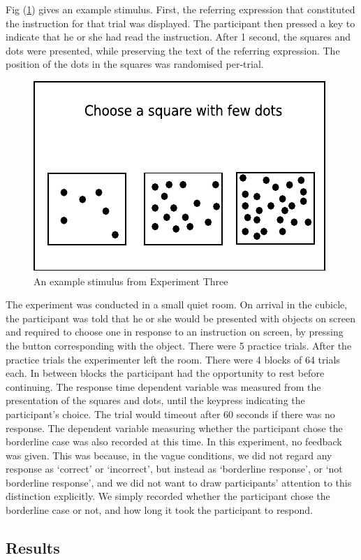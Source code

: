\documentclass[doc,apacite]{apa6}
\begin{document}
Fig (\ref{stimuluse3}) gives an example stimulus. First, the referring expression that constituted the instruction for that trial was displayed. The participant then pressed a key to indicate that he or she had read the instruction. After 1 second,  the squares and dots were presented, while preserving the text of the referring expression. The position of the dots in the squares was randomised per-trial.

\begin{figure}[tbp]
\centering
\includegraphics[width=.4\textwidth]{images/stimuluse3}
\caption{An example stimulus from Experiment Three}
\label{stimuluse3}
\end{figure}

The experiment was conducted in a small quiet room.
On arrival in the cubicle, the participant was told that he or she would be presented with objects on screen and required to choose one in response to an instruction on screen, by pressing the button corresponding with the object. There were 5 practice trials. After the practice trials the experimenter left the room. There were 4 blocks of 64 trials each. In between blocks the participant had the opportunity to rest before continuing. The response time dependent variable was measured from the presentation of the squares and dots, until the keypress indicating the participant's choice. The trial would timeout after 60 seconds if there was no response. The dependent variable measuring whether the participant chose the borderline case was also recorded at this time. In this experiment, no feedback was given. This was because, in the vague conditions, we did not regard any response as `correct' or `incorrect', but instead as `borderline response', or `not borderline response', and we did not want to draw participants' attention to this distinction explicitly. We simply recorded whether the participant chose the borderline case or not, and how long it took the participant to respond.

\subsection{Results}
\end{document}
